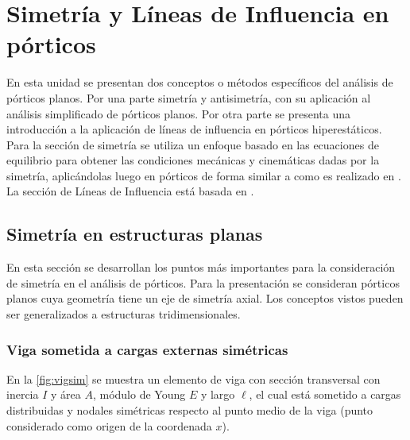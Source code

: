 %
%
%

\chapter[Simetría y Líneas de Influencia en pórticos]{Simetría y Líneas de Influencia en pórticos}


En esta unidad se presentan dos conceptos o métodos específicos del análisis de pórticos planos.  Por una parte simetría y antisimetría, con su aplicación al análisis simplificado de pórticos planos. Por otra parte se presenta una introducción a la aplicación de líneas de influencia en pórticos hiperestáticos. %
%
Para la sección de simetría se utiliza un enfoque basado en las ecuaciones de equilibrio para obtener las condiciones mecánicas y cinemáticas dadas por la simetría, aplicándolas luego en pórticos de forma similar a como es realizado en \citep{CerveraRuiz2002ii}. %
%
La sección de Líneas de Influencia está basada en \citep{Celigueta2003}.




\section{Simetría en estructuras planas}

En esta sección se desarrollan los puntos más importantes para la consideración de simetría en el análisis de pórticos. %
%
Para la presentación se consideran pórticos planos cuya geometría tiene un eje de simetría axial. %
%
Los conceptos vistos pueden ser generalizados a estructuras tridimensionales.

\subsection{Viga sometida a cargas externas simétricas}

En la \autoref{fig:vigsim} se muestra un elemento de viga con sección transversal con inercia $I$ y área $A$, módulo de Young $E$ y largo $\ell$, el cual está sometido a cargas distribuidas y nodales simétricas respecto al punto medio de la viga (punto considerado como origen de la coordenada $x$). %

